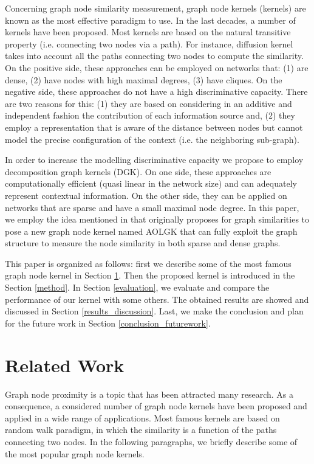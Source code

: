 \documentclass{esannV2}
\begin{document}
Concerning graph node similarity measurement, graph node kernels (kernels) are known as the most effective paradigm to use. In the last decades, a number of kernels have been proposed. Most kernels are based on the natural transitive property (i.e. connecting two nodes via a path). For instance, diffusion kernel takes into account all the paths connecting two nodes to compute the similarity. On the positive side, these approaches can be employed on networks that: (1) are dense, (2) have nodes with high maximal degrees, (3) have cliques. On the negative side, these approaches do not have a high discriminative capacity. There are two reasons for this: (1) they are based on considering in an additive and independent fashion the contribution of each information source and, (2) they employ a representation that is aware of the distance between nodes but cannot model the precise configuration of the context (i.e. the neighboring sub-graph).

In order to increase the modelling discriminative capacity we propose to employ decomposition graph kernels (DGK). On one side, these approaches are computationally efficient (quasi linear in the network size) and can adequately represent contextual information. On the other side, they can be applied on networks that are sparse and have a small maximal node degree. In this paper, we employ the idea mentioned in \cite{nspdk} that originally proposes for graph similarities to pose a new graph node kernel named AOLGK that can fully exploit the graph structure to measure the node similarity in both sparse and dense graphs.

This paper is organized as follows: first we describe some of the most famous graph node kernel in Section \ref{related_work}. Then the proposed kernel is introduced in the Section \ref{method}. In Section \ref{evaluation}, we evaluate and compare the performance of our kernel with some others. The obtained results are showed and discussed in Section \ref{results_discussion}. Last, we make the conclusion and plan for the future work in Section \ref{conclusion_futurework}.

\section{Related Work} \label{related_work}
Graph node proximity is a topic that has been attracted many research. As a consequence, a considered number of graph node kernels have been proposed and applied in a wide range of applications. Most famous kernels are based on random walk paradigm, in which the similarity is a function of the paths connecting two nodes. In the following paragraphs, we briefly describe some of the most popular graph node kernels.
\end{document}
